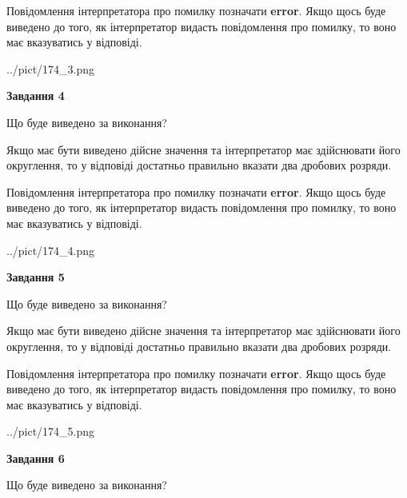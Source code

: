 \documentclass[12pt, ukrainian]{article}
\begin{document}
{\begin {Large}
Повідомлення інтерпретатора про помилку позначати \textbf{error}.
Якщо щось буде виведено до того, як інтерпретатор видасть повідомлення про помилку, 
то воно має вказуватись у відповіді. \par

\begin{center}
	{../pict/174_3.png}
\end{center}
\newpage

{\begin {center}\textbf{Завдання 4}\end {center}}\par
Що буде виведено за виконання? \par

Якщо має бути виведено дійсне значення та інтерпретатор має здійснювати його округлення, 
то у відповіді достатньо правильно вказати два дробових розряди.

Повідомлення інтерпретатора про помилку позначати \textbf{error}.
Якщо щось буде виведено до того, як інтерпретатор видасть повідомлення про помилку, 
то воно має вказуватись у відповіді. \par

\begin{center}
	{../pict/174_4.png}
\end{center}
\newpage

{\begin {center}\textbf{Завдання 5}\end {center}}\par
Що буде виведено за виконання? \par

Якщо має бути виведено дійсне значення та інтерпретатор має здійснювати його округлення, 
то у відповіді достатньо правильно вказати два дробових розряди.

Повідомлення інтерпретатора про помилку позначати \textbf{error}.
Якщо щось буде виведено до того, як інтерпретатор видасть повідомлення про помилку, 
то воно має вказуватись у відповіді. \par

\begin{center}
	{../pict/174_5.png}
\end{center}
\newpage

{\begin {center}\textbf{Завдання 6}\end {center}}\par
Що буде виведено за виконання? \par


\end{Large}}
\end{document}
